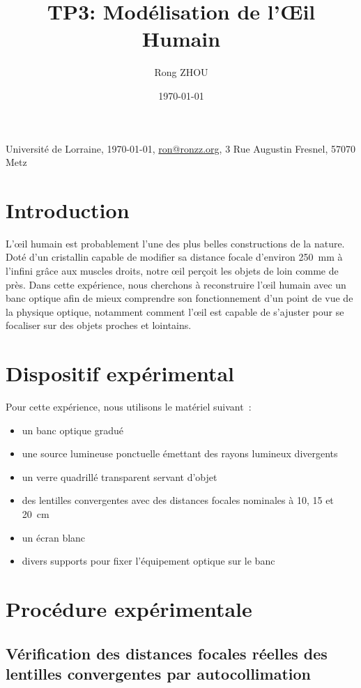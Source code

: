 \documentclass[a4paper,11pt]{article}
\title{TP3: Modélisation de l'Œil Humain}
\author{Rong ZHOU}
\date{\today}
\newcommand{\univaddress}{3 Rue Augustin Fresnel, 57070 Metz}
\begin{document}
\maketitle
\begin{center}
  \small Universit\'e de Lorraine, \today, \href{mailto:ron@ronzz.org}{ron@ronzz.org}, \univaddress
\end{center}

\section{Introduction}

L'œil humain est probablement l'une des plus belles constructions de la nature. Doté d'un cristallin capable de modifier sa distance focale d'environ 250~mm à l'infini grâce aux muscles droits, notre œil perçoit les objets de loin comme de près. Dans cette expérience, nous cherchons à reconstruire l'œil humain avec un banc optique afin de mieux comprendre son fonctionnement d'un point de vue de la physique optique, notamment comment l'œil est capable de s'ajuster pour se focaliser sur des objets proches et lointains.

\section{Dispositif expérimental}

Pour cette expérience, nous utilisons le matériel suivant~:

\begin{itemize}
    \item un banc optique gradué
    \item une source lumineuse ponctuelle émettant des rayons lumineux divergents
    \item un verre quadrillé transparent servant d'objet
    \item des lentilles convergentes avec des distances focales nominales à 10, 15 et 20~cm
    \item un écran blanc
    \item divers supports pour fixer l'équipement optique sur le banc
\end{itemize}

\section{Procédure expérimentale}

\subsection{Vérification des distances focales réelles des lentilles convergentes par autocollimation}
\end{document}
